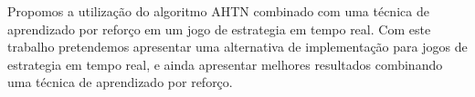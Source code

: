 Propomos a utilização do algoritmo AHTN combinado com uma técnica de aprendizado por reforço em um jogo de estrategia em tempo real. 
Com este trabalho pretendemos apresentar uma alternativa de implementação para jogos de estrategia em tempo real, e ainda apresentar melhores resultados combinando uma técnica de aprendizado por reforço.




